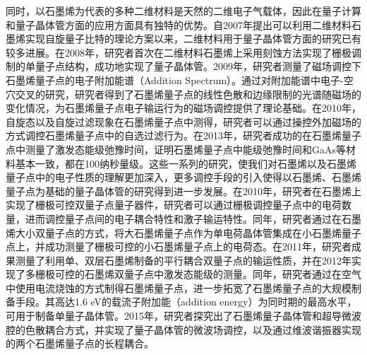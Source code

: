     同时，以石墨烯为代表的多种二维材料是天然的二维电子气载体，因此在量子计算和量子晶体管方面的应用方面具有独特的优势。自2007年提出可以利用二维材料石墨烯实现自旋量子比特的理论方案以来，二维材料用于量子晶体管方面的研究已有较多进展。在2008年，研究者首次在二维材料石墨烯上采用刻蚀方法实现了栅极调制的单量子点结构，成功地实现了量子晶体管。2009年，研究者测量了磁场调控下石墨烯量子点的电子附加能谱（Addition Spectrum）。通过对附加能谱中电子-空穴交叉的研究，研究者得到了石墨烯量子点的线性色散和边缘限制的光谱随磁场的变化情况，为石墨烯量子点电子输运行为的磁场调控提供了理论基础。在2010年，自旋态以及自旋过滤现象在石墨烯量子点中测得，研究者可以通过操控外加磁场的方式调控石墨烯量子点中的自选过滤行为。在2013年，研究者成功的在石墨烯量子点中测量了激发态能级弛豫时间，证明石墨烯量子点中能级弛豫时间和GaAs等材料基本一致，都在100纳秒量级。这些一系列的研究，使我们对石墨烯以及石墨烯量子点中的电子性质的理解更加深入，更多调控手段的引入使得以石墨烯、石墨烯量子点为基础的量子晶体管的研究得到进一步发展。在2010年，研究者在石墨烯上实现了栅极可控双量子点量子器件，研究者可以通过栅极调控量子点中的电荷数量，进而调控量子点间的电子耦合特性和激子输运特性。同年，研究者通过在石墨烯大小双量子点的方式，将大石墨烯量子点作为单电荷晶体管集成在小石墨烯量子点上，并成功测量了栅极可控的小石墨烯量子点上的电荷态。在2011年，研究者成果测量了利用单、双层石墨烯制备的平行耦合双量子点的输运性质，并在2012年实现了多栅极可控的石墨烯双量子点中激发态能级的测量。同年，研究者通过在空气中使用电流烧蚀的方式制得石墨烯量子点，进一步拓宽了石墨烯量子点的大规模制备手段。其高达1.6 eV的载流子附加能（addition energy）为同时期的最高水平，可用于制备单量子晶体管。2015年，研究者探究出了石墨烯量子晶体管和超导微波腔的色散耦合方式，并实现了量子晶体管的微波场调控，以及通过维波谐振器实现的两个石墨烯量子点的长程耦合。

